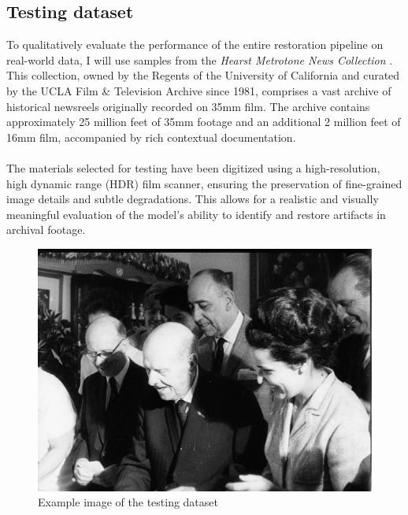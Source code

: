 \documentclass[openany, 12pt]{article}
\begin{document}
{	\subsection{Testing dataset}
	To qualitatively evaluate the performance of the entire restoration pipeline on real-world data, I will use samples from the \textit{Hearst Metrotone News Collection} \cite{newsreel}. This collection, owned by the Regents of the University of California and curated by the UCLA Film \& Television Archive since 1981, comprises a vast archive of historical newsreels originally recorded on 35mm film. The archive contains approximately 25 million feet of 35mm footage and an additional 2 million feet of 16mm film, accompanied by rich contextual documentation.\\\\
	The materials selected for testing have been digitized using a high-resolution, high dynamic range (HDR) film scanner, ensuring the preservation of fine-grained image details and subtle degradations. This allows for a realistic and visually meaningful evaluation of the model's ability to identify and restore artifacts in archival footage.
	\begin{figure}[h!]
		\centering
		\includegraphics[width=0.5\linewidth]{images/news.png}
		\caption{\smaller Example image of the testing dataset} 
	\end{figure}
}
	\newpage
\end{document}
